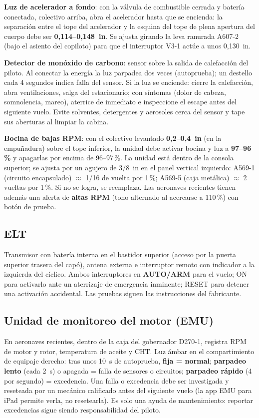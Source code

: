 \textbf{Luz de acelerador a fondo}: con la válvula de combustible cerrada y batería conectada, colectivo arriba, abra el acelerador hasta que se encienda: la separación entre el tope del acelerador y la esquina del tope de plena apertura del cuerpo debe ser \textbf{0,114--0,148~in}. Se ajusta girando la leva ranurada A607-2 (bajo el asiento del copiloto) para que el interruptor V3-1 actúe a unos 0,130~in.

\textbf{Detector de monóxido de carbono}: sensor sobre la salida de calefacción del piloto. Al conectar la energía la luz parpadea dos veces (autoprueba); un destello cada 4 segundos indica falla del sensor. Si la luz se enciende: cierre la calefacción, abra ventilaciones, salga del estacionario; con síntomas (dolor de cabeza, somnolencia, mareo), aterrice de inmediato e inspeccione el escape antes del siguiente vuelo. Evite solventes, detergentes y aerosoles cerca del sensor y tape sus aberturas al limpiar la cabina.

\textbf{Bocina de bajas RPM}: con el colectivo levantado \textbf{0,2--0,4~in} (en la empuñadura) sobre el tope inferior, la unidad debe activar bocina y luz a \textbf{97--96\,\%} y apagarlas por encima de 96--97\,\%. La unidad está dentro de la consola superior; se ajusta por un agujero de 3/8~in en el panel vertical izquierdo: A569-1 (circuito encapsulado) $\approx$ 1/16 de vuelta por 1\,\%; A569-5 (caja metálica) $\approx$ 2 vueltas por 1\,\%. Si no se logra, se reemplaza. Las aeronaves recientes tienen además una alerta de \textbf{altas RPM} (tono alternado al acercarse a 110\,\%) con botón de prueba.

\subsection{ELT}

Transmisor con batería interna en el bastidor superior (acceso por la puerta superior trasera del capó), antena externa e interruptor remoto con indicador a la izquierda del cíclico. Ambos interruptores en \textbf{AUTO/ARM} para el vuelo; ON para activarlo ante un aterrizaje de emergencia inminente; RESET para detener una activación accidental. Las pruebas siguen las instrucciones del fabricante.

\subsection{Unidad de monitoreo del motor (EMU)}

En aeronaves recientes, dentro de la caja del gobernador D270-1, registra RPM de motor y rotor, temperatura de aceite y CHT. Luz ámbar en el compartimiento de equipaje derecho: tras unos 10~s de autoprueba, \textbf{fija = normal}; \textbf{parpadeo lento} (cada 2~s) o apagada = falla de sensores o circuitos; \textbf{parpadeo rápido} (4 por segundo) = excedencia. Una falla o excedencia debe ser investigada y reseteada por un mecánico calificado antes del siguiente vuelo (la app EMU para iPad permite verla, no resetearla). Es solo una ayuda de mantenimiento: reportar excedencias sigue siendo responsabilidad del piloto.

